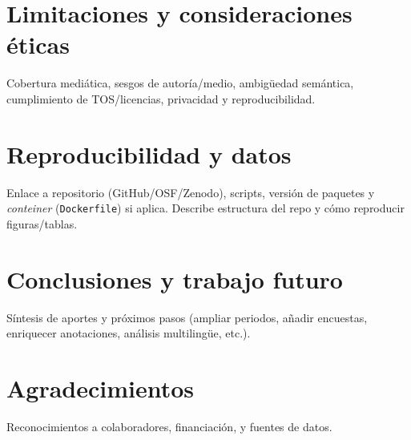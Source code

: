 \documentclass[11pt,a4paper]{article}
\begin{document}
	
	\section{Limitaciones y consideraciones éticas}
	Cobertura mediática, sesgos de autoría/medio, ambigüedad semántica, cumplimiento de TOS/licencias, privacidad y reproducibilidad.
	
	\section{Reproducibilidad y datos}
	Enlace a repositorio (GitHub/OSF/Zenodo), scripts, versión de paquetes y \emph{conteiner} (\texttt{Dockerfile}) si aplica. 
	Describe estructura del repo y cómo reproducir figuras/tablas.
	
	\section{Conclusiones y trabajo futuro}
	Síntesis de aportes y próximos pasos (ampliar periodos, añadir encuestas, enriquecer anotaciones, análisis multilingüe, etc.).
	
	\section*{Agradecimientos}
	Reconocimientos a colaboradores, financiación, y fuentes de datos.
	
	
	\appendix

	
\end{document}
